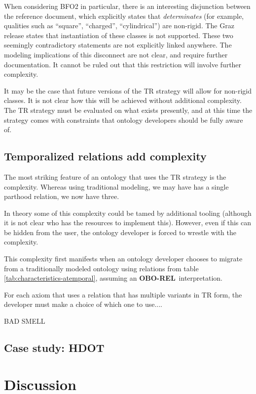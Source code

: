 \documentclass{bioinfo}
\def\OBOREL{\textbf{OBO-REL}}
\begin{document}
When considering BFO2 in particular, there is an interesting
disjunction between the reference document, which explicitly states
that \emph{determinates} (for example, qualities such as ``square'',
``charged'', ``cylindrical'') are non-rigid. The Graz release states
that instantiation of these classes is not supported. These two
seemingly contradictory statements are not explicitly linked
anywhere. The modeling implications of this disconnect are not clear,
and require further documentation. It cannot be ruled out that this
restriction will involve further complexity.

It may be the case that future versions of the TR strategy will allow
for non-rigid classes. It is not clear how this will be achieved
without additional complexity.  The TR strategy must be evaluated on
what exists presently, and at this time the strategy comes with
constraints that ontology developers should be fully aware of.

\subsection{Temporalized relations add complexity}

The most striking feature of an ontology that uses the TR strategy is
the complexity. Whereas using traditional modeling, we may have has a
single parthood relation, we now have three.

In theory some of this complexity could be tamed by additional tooling
(although it is not clear who has the resources to implement
this). However, even if this can be hidden from the user, the ontology
developer is forced to wrestle with the complexity.

This complexity first manifests when an ontology developer chooses to
migrate from a traditionally modeled ontology using relations from
table \ref{tab:characteristics-atemporal}, assuming an \OBOREL\
interpretation.

For each axiom that uses a relation that has multiple variants in TR
form, the developer must make a choice of which one to use....

BAD SMELL

\subsection{Case study: HDOT}




\section{Discussion}
\end{document}
